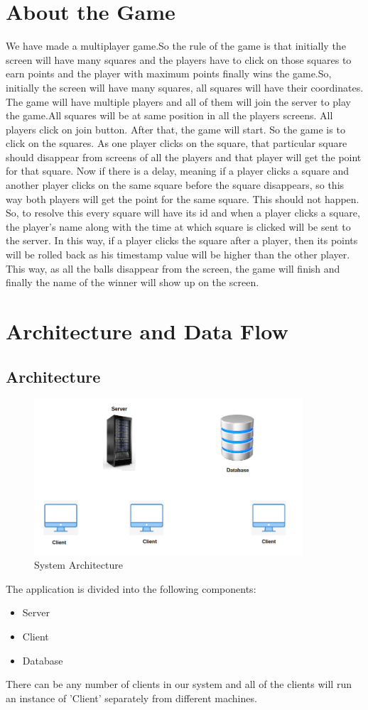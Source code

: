 \documentclass[manuscript,screen,review,nonacm]{acmart}
\begin{document}
\section{About the Game}
We have made a multiplayer game.So the rule of  the game is that initially the screen will have many squares and the players have to click on those squares to earn points and the player with maximum points finally wins the game.So, initially the screen will have many squares, all squares will have their coordinates. The game will have multiple players and all of them will join the server to play the game.All squares will be at same position in all the players screens. All players click on join button.  After that, the game will start. So the game is to click on the squares. As one player clicks on the square, that particular square should disappear from screens of all the players and that player will get the point for that square. Now if there is a delay, meaning if a player clicks a square and another player clicks on the same square before the square disappears, so this way both players will get the point for the same square. This should not happen. So, to resolve this every square will have its id and when a player clicks a square, the player's name along with the time at which square is clicked will be sent to the server. In this way, if a player clicks the square after a player, then its points will be rolled back as his timestamp value will be higher than the other player. This way, as all the balls disappear from the screen, the game will finish and finally the name of the winner will show up on the screen.

\section{Architecture and Data Flow}
\subsection{Architecture}
\begin{figure}[htp]
    \centering
    \includegraphics[width=10cm]{dfd-0.png}
    \caption{System Architecture}
    \label{fig:galaxy}
\end{figure}
The application is divided into the following components:
\begin{itemize}
    \item Server
    \item Client
    \item Database
\end{itemize}
There can be any number of clients in our system and all of the clients will run an instance of 'Client' separately from different machines. 
\end{document}
